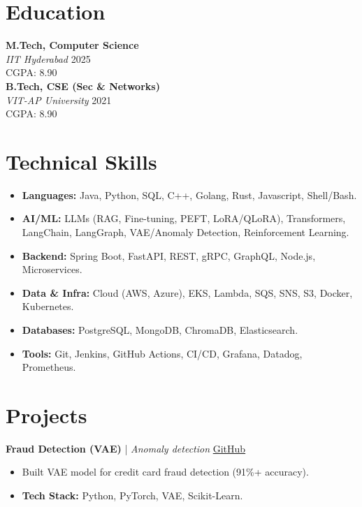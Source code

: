 \documentclass[10pt,a4paper]{article}
\newcommand{\resumeItem}[1]{\item\small{#1}}
\begin{document}
\noindent
\begin{minipage}[t]{0.38\textwidth} %
    
    \section{Education}
    \textbf{M.Tech, Computer Science} \\
    \textit{IIT Hyderabad} \hfill 2025 \\
    CGPA: 8.90 \\
    
    \vspace{2pt}
    \textbf{B.Tech, CSE (Sec \& Networks)} \\
    \textit{VIT-AP University} \hfill 2021 \\
    CGPA: 8.90 \\
    
    \section{Technical Skills}
    \begin{itemize}[leftmargin=*, itemsep=1pt, parsep=1pt]
        \item \textbf{Languages:} Java, Python, SQL, C++, Golang, Rust, Javascript, Shell/Bash.
        \item \textbf{AI/ML:} LLMs (RAG, Fine-tuning, PEFT, LoRA/QLoRA), Transformers, LangChain, LangGraph, VAE/Anomaly Detection, Reinforcement Learning.
        \item \textbf{Backend:} Spring Boot, FastAPI, REST, gRPC, GraphQL, Node.js, Microservices.
        \item \textbf{Data \& Infra:} Cloud (AWS, Azure), EKS, Lambda, SQS, SNS, S3, Docker, Kubernetes.
        \item \textbf{Databases:} PostgreSQL, MongoDB, ChromaDB, Elasticsearch.
        \item \textbf{Tools:} Git, Jenkins, GitHub Actions, CI/CD, Grafana, Datadog, Prometheus.
    \end{itemize}

    \section{Projects}
    \textbf{Fraud Detection (VAE)} | \small \textit{Anomaly detection} \hfill \href{https://github.com/kaulmesanyam/IITH\_MTech/}{\small GitHub} \\
    \vspace{-6pt}
    \begin{itemize}[leftmargin=*, nosep]
        \resumeItem{Built VAE model for credit card fraud detection (91\%+ accuracy).}
        \resumeItem{\textbf{Tech Stack:} Python, PyTorch, VAE, Scikit-Learn.}
    \end{itemize}
    

\end{minipage}
\end{document}
